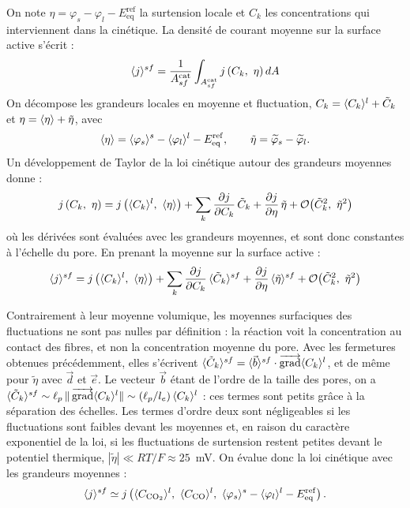 On note $\eta = \varphi_s - \varphi_l - E_{\mathrm{eq}}^{\mathrm{ref}}$ la
surtension locale et $C_k$ les concentrations qui interviennent dans la
cinétique. La densité de courant moyenne sur la surface active s'écrit :
\begin{equation}
\langle j \rangle^{sf} = \frac{1}{A_{sf}^{\mathrm{cat}}}\int_{A_{sf}^{\mathrm{cat}}}
j\left(C_k,\ \eta\right) dA
\end{equation}
On décompose les grandeurs locales en moyenne et fluctuation,
$C_k = \langle C_k \rangle^l + \tilde{C}_k$ et $\eta = \langle \eta \rangle + \tilde{\eta}$, avec
\begin{equation}
\langle \eta \rangle = \langle \varphi_s \rangle^s - \langle \varphi_l \rangle^l - E_{\mathrm{eq}}^{\mathrm{ref}},
\qquad
\tilde{\eta} = \widetilde{\varphi}_s - \widetilde{\varphi}_l .
\end{equation}
Un développement de Taylor de la loi cinétique autour des grandeurs
moyennes donne :
\begin{equation}
j\left(C_k,\ \eta\right) = j\left(\langle C_k \rangle^l,\ \langle \eta \rangle\right)
+ \sum_k \frac{\partial j}{\partial C_k}\,\tilde{C}_k
+ \frac{\partial j}{\partial \eta}\,\tilde{\eta}
+ \mathcal{O}\!\left(\tilde{C}_k^2,\ \tilde{\eta}^2\right)
\end{equation}
où les dérivées sont évaluées avec les grandeurs moyennes, et sont donc
constantes à l'échelle du pore. En prenant la moyenne sur la surface
active :
\begin{equation}
\langle j \rangle^{sf} = j\left(\langle C_k \rangle^l,\ \langle \eta \rangle\right)
+ \sum_k \frac{\partial j}{\partial C_k}\,\langle \tilde{C}_k \rangle^{sf}
+ \frac{\partial j}{\partial \eta}\,\langle \tilde{\eta} \rangle^{sf}
+ \mathcal{O}\!\left(\tilde{C}_k^2,\ \tilde{\eta}^2\right)
\end{equation}

Contrairement à leur moyenne volumique, les moyennes surfaciques des
fluctuations ne sont pas nulles par définition : la réaction voit la
concentration au contact des fibres, et non la concentration moyenne du
pore. Avec les fermetures obtenues précédemment, elles s'écrivent
$\langle \tilde{C}_k \rangle^{sf} = \langle \vec{b} \rangle^{sf}\cdot\mathop{\overrightarrow{\operatorname{grad}}}\nolimits\langle C_k \rangle^l$, et de
même pour $\tilde{\eta}$ avec $\vec{d}$ et $\vec{e}$. Le vecteur $\vec{b}$
étant de l'ordre de la taille des pores, on a
$\langle \tilde{C}_k \rangle^{sf} \sim \ell_p\,\|\mathop{\overrightarrow{\operatorname{grad}}}\nolimits\langle C_k \rangle^l\| \sim
(\ell_p/l_e)\,\langle C_k \rangle^l$ : ces termes sont petits grâce à la séparation
des échelles. Les termes d'ordre deux sont négligeables si les
fluctuations sont faibles devant les moyennes et, en raison du caractère
exponentiel de la loi, si les fluctuations de surtension restent petites
devant le potentiel thermique, $|\tilde{\eta}| \ll RT/F \approx 25$~mV. On
évalue donc la loi cinétique avec les grandeurs moyennes :
\begin{equation}
\langle j \rangle^{sf} \simeq j\left(\langle C_{\mathrm{CO_2}} \rangle^l,\ \langle C_{\mathrm{CO}} \rangle^l,\
\langle \varphi_s \rangle^s - \langle \varphi_l \rangle^l - E_{\mathrm{eq}}^{\mathrm{ref}}\right).
\label{eq:j_homo}
\end{equation}

